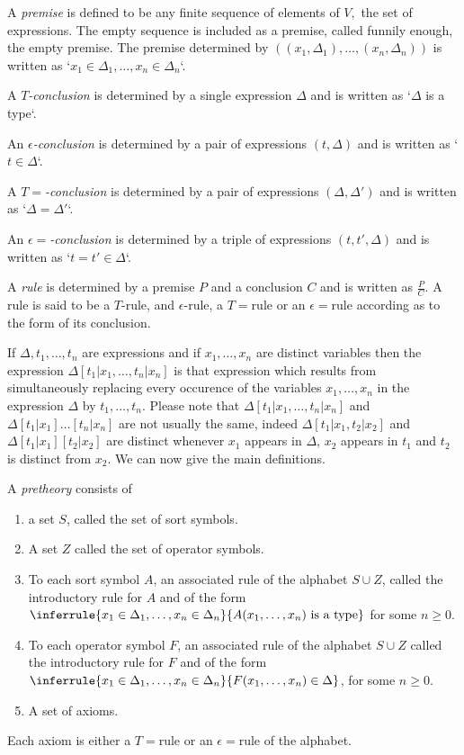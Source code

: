 A \emph{premise} is defined to be any finite sequence of elements of $V,$  the set of expressions. The empty sequence is included as a premise, called funnily enough, the empty premise.
%
The premise determined by $((x_1,\Delta_1),\ldots,(x_n,\Delta_n))$ is written as `$x_1\in\Delta_1,\ldots,x_n\in\Delta_n$`.


A \emph{$T$-conclusion} is determined by a single expression $\Delta$ and is written as `$\Delta$ is a type`.


An \emph{$\epsilon$-conclusion}  is determined by a pair of expressions $(t,\Delta)$ and is written as `$t\in\Delta$`.


A \emph{$T=$-conclusion} is determined by a pair of expressions $(\Delta,\Delta')$ and is written as `$\Delta=\Delta'$`.


An \emph{$\epsilon=$-conclusion} is determined by a triple of expressions $(t,t',\Delta)$ and is written as `$t=t'\in\Delta$`.


A \emph{rule} is determined by a premise $P$ and a conclusion $C$ and is written as $\frac{P}{C}$. A rule is said to be a $T$-rule, and $\epsilon$-rule, a $T=$rule or an $\epsilon=$rule according as to the form of its conclusion.


If $\Delta,t_1,\ldots,t_n$ are expressions and if $x_1,\ldots,x_n$ are distinct variables then the expression $\Delta[t_1|x_1,\ldots,t_n|x_n]$ is that expression which results from simultaneously replacing every occurence of the variables $x_1,\ldots,x_n$ in the expression $\Delta$ by $t_1,\ldots,t_n$.
%
Please note that $\Delta[t_1|x_1,\ldots,t_n|x_n]$ and $\Delta[t_1|x_1]\ldots[t_n|x_n]$ are not usually the same, indeed $\Delta[t_1|x_1,t_2|x_2]$ and $\Delta[t_1|x_1][t_2|x_2]$ are distinct whenever $x_1$ appears in $\Delta$, $x_2$ appears in $t_1$ and $t_2$ is distinct from $x_2$.
%
We can now give the main definitions.


\begin{definition}[1]
A \emph{pretheory} consists of 
\begin{enumerate}
\item a set $S$, called the set of sort symbols.%
\item A set $Z$ called the set of operator symbols.
\item To each sort symbol $A$, an associated rule of the alphabet $S\cup Z$, called the introductory rule for $A$ and of the form $\inferrule{x_1\in\Delta_1,\ldots,x_n\in\Delta_n}{A(x_1,\ldots,x_n) \isatype}$ for some $n\geq 0$.
\item To each operator symbol $F$, an associated rule of the alphabet $S\cup Z$ called the introductory rule for $F$ and of the form $\inferrule{x_1\in\Delta_1,\ldots,x_n\in\Delta_n}{F(x_1,\ldots,x_n)\in\Delta}$, for some $n\geq 0$.
\item A set of axioms.
\end{enumerate}

Each axiom is either a $T=$rule or an $\epsilon=$rule of the alphabet.
\end{definition}

